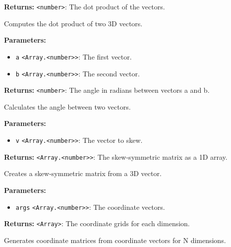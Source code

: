 \documentclass[12pt,a4paper]{article}
\begin{document}
\noindent \textbf{Returns:} \texttt{<number>}: The dot product of the vectors.

\noindent Computes the dot product of two 3D vectors.

\vspace{5mm}
\noindent {}


\noindent \textbf{Parameters:}
\begin{itemize}
  \item \texttt{a} \texttt{<Array.<number>>}: The first vector.
  \item \texttt{b} \texttt{<Array.<number>>}: The second vector.
\end{itemize}

\noindent \textbf{Returns:} \texttt{<number>}: The angle in radians between vectors a and b.

\noindent Calculates the angle between two vectors.

\vspace{5mm}
\noindent {}


\noindent \textbf{Parameters:}
\begin{itemize}
  \item \texttt{v} \texttt{<Array.<number>>}: The vector to skew.
\end{itemize}

\noindent \textbf{Returns:} \texttt{<Array.<number>>}: The skew-symmetric matrix as a 1D array.

\noindent Creates a skew-symmetric matrix from a 3D vector.

\vspace{5mm}
\noindent {}


\noindent \textbf{Parameters:}
\begin{itemize}
  \item \texttt{args} \texttt{<Array.<number>>}: The coordinate vectors.
\end{itemize}

\noindent \textbf{Returns:} \texttt{<Array>}: The coordinate grids for each dimension.

\noindent Generates coordinate matrices from coordinate vectors for N dimensions.
\end{document}
